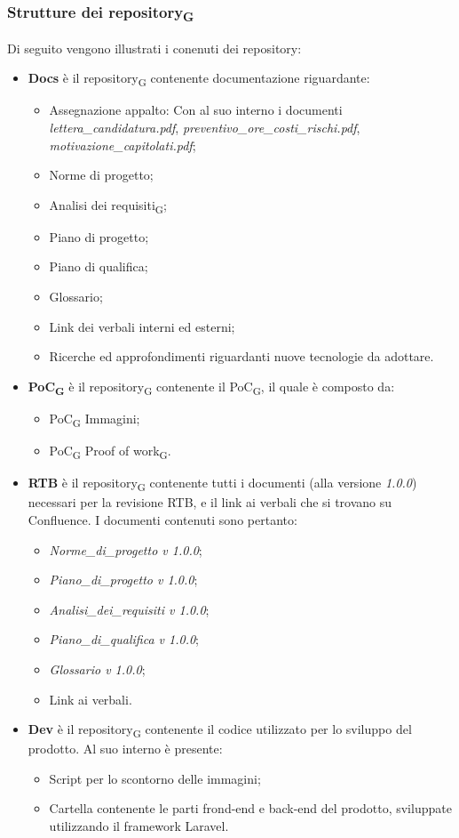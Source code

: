 \subsubsection{Strutture dei repository\textsubscript{G}}
Di seguito vengono illustrati i conenuti dei repository:
\begin{itemize}
	\item \textbf{Docs} è il repository\textsubscript{G} contenente documentazione riguardante:
	\begin{itemize}
		\item Assegnazione appalto: Con al suo interno i documenti \textit{lettera\_candidatura.pdf}, 
		\textit{preventivo\_ore\_costi\_rischi.pdf}, 
		\textit{motivazione\_capitolati.pdf};
		\item Norme di progetto;
		\item Analisi dei requisiti\textsubscript{G};
		\item Piano di progetto;
		\item Piano di qualifica;
		\item Glossario;
		\item Link dei verbali interni ed esterni;
		\item Ricerche ed approfondimenti riguardanti nuove tecnologie da adottare.
	\end{itemize}
	\item \textbf{PoC\textsubscript{G}} è il repository\textsubscript{G} contenente il PoC\textsubscript{G}, il quale è composto da:
	\begin{itemize}
		\item PoC\textsubscript{G} Immagini;
		\item PoC\textsubscript{G} Proof of work\textsubscript{G}.
	\end{itemize}
	\item \textbf{RTB} è il repository\textsubscript{G} contenente tutti i documenti (alla versione \textit{1.0.0}) necessari per la revisione RTB, e il link ai verbali che si trovano su Confluence. I documenti contenuti sono pertanto:
	\begin{itemize}
		\item \textit{Norme\_di\_progetto v 1.0.0};
		\item \textit{Piano\_di\_progetto v 1.0.0};
		\item \textit{Analisi\_dei\_requisiti v 1.0.0};
		\item \textit{Piano\_di\_qualifica v 1.0.0};
		\item \textit{Glossario v 1.0.0};
		\item Link ai verbali.
	\end{itemize}
	\item \textbf{Dev} è il repository\textsubscript{G} contenente il codice utilizzato per lo sviluppo del prodotto. Al suo interno è presente:
	\begin{itemize}
		\item Script per lo scontorno delle immagini;
		\item Cartella contenente le parti frond-end e back-end del prodotto, sviluppate utilizzando il framework Laravel.
	\end{itemize}
\end{itemize}
